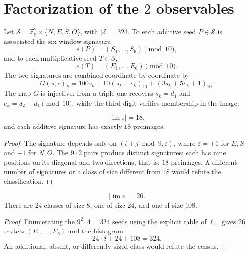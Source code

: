 \section{Factorization of the \(2\) observables}

Let \(\mathcal S=\mathbb Z_9^2\times\{N,E,S,O\}\), with
\(|\mathcal S|=324\). To each additive seed \(P\in\mathcal S\) is
associated the six-window signature
\[
s(P)=(S_1,\ldots,S_6)\pmod{10},
\]
and to each multiplicative seed \(T\in\mathcal S\),
\[
e(T)=(E_1,\ldots,E_6)\pmod{10}.
\]
The two signatures are combined coordinate by coordinate by
\[
G(s,e)_k=
100s_k+10(s_k+e_k)_{10}+(3s_k+5e_k+1)_{10}.
\]
The map \(G\) is injective: from a triple one recovers
\(s_k=d_1\) and \(e_k=d_2-d_1\pmod{10}\), while the third digit verifies
membership in the image.

\begin{lemma}
\label{pf84:E02-18}
\[
 |\operatorname{im}s|=18,
\]
and each additive signature has exactly \(18\) preimages.
\end{lemma}
\begin{proof}
The signature depends only on
\((i+j\bmod9,\varepsilon)\), where \(\varepsilon=+1\) for \(E,S\) and
\(-1\) for \(N,O\). The \(9\cdot2\) pairs produce distinct signatures; each
has nine positions on its diagonal and two directions, that is,
\(18\) preimages. A different number of signatures or a class of size
different from \(18\) would refute the classification.
\end{proof}

\begin{lemma}
\label{pf84:E02-19}
\[
 |\operatorname{im}e|=26.
\]
There are \(24\) classes of size \(8\), one of size \(24\), and one of size
\(108\).
\end{lemma}
\begin{proof}
Enumerating the \(9^2\cdot4=324\) seeds using the explicit table of \(\ell_\times\) gives \(26\) sextets
\((E_1,\ldots,E_6)\) and the histogram
\[
 24\cdot8+24+108=324.
\]
An additional, absent, or differently sized class would refute the census.
\end{proof}

